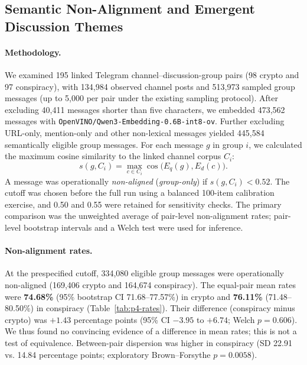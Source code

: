 \subsection{Semantic Non-Alignment and Emergent Discussion Themes}\label{sec:point4}

\paragraph{Methodology.}
We examined 195 linked Telegram channel--discussion-group pairs (98 crypto and 97 conspiracy), with 134,984 observed channel posts and 513,973 sampled group messages (up to 5,000 per pair under the existing sampling protocol). After excluding 40,411 messages shorter than five characters, we embedded 473,562 messages with \texttt{OpenVINO/Qwen3-Embedding-0.6B-int8-ov}. Further excluding URL-only, mention-only and other non-lexical messages yielded 445,584 semantically eligible group messages. For each message $g$ in group $i$, we calculated the maximum cosine similarity to the linked channel corpus $C_i$:
\begin{equation}
  s(g,C_i)=\max_{c\in C_i}\cos\bigl(E_q(g),E_d(c)\bigr).
\end{equation}
A message was operationally \emph{non-aligned} (\emph{group-only}) if $s(g,C_i)<0.52$. The cutoff was chosen before the full run using a balanced 100-item calibration exercise, and 0.50 and 0.55 were retained for sensitivity checks. The primary comparison was the unweighted average of pair-level non-alignment rates; pair-level bootstrap intervals and a Welch test were used for inference.

\paragraph{Non-alignment rates.}
At the prespecified cutoff, 334,080 eligible group messages were operationally non-aligned (169,406 crypto and 164,674 conspiracy). The equal-pair mean rates were \textbf{74.68\%} (95\% bootstrap CI 71.68--77.57\%) in crypto and \textbf{76.11\%} (71.48--80.50\%) in conspiracy (Table~\ref{tab:p4-rates}). Their difference (conspiracy minus crypto) was $+1.43$ percentage points (95\% CI $-3.95$ to $+6.74$; Welch $p=0.606$). We thus found no convincing evidence of a difference in mean rates; this is not a test of equivalence. Between-pair dispersion was higher in conspiracy (SD 22.91 vs. 14.84 percentage points; exploratory Brown--Forsythe $p=0.0058$).

